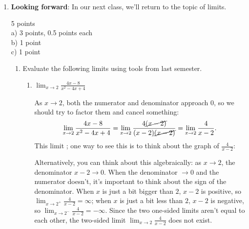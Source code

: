 \documentclass{article}
\begin{document}
\begin{enumerate}


\item %

\textbf{Looking forward}:  In our next class, we'll return to the topic of limits.
  \begin{grading}
  5 points\\
  a) 3 points, 0.5 points each\\
  b) 1 point\\
  c) 1 point
  \end{grading}

  \begin{enumerate}
  \item  \label{lhopital-prep-old-limits}
    Evaluate the following limits using tools from last semester. 
    \begin{enumerate}      

      \item \label{lhopital-prep-old-limits-0/0-1}
        \begin{problem}[\vfill]
          $\displaystyle \lim_{x\to 2} \frac{4x-8}{x^2-4x+4}$
        \end{problem}
        

        \begin{solution}
          As $x \to 2$, both the numerator and denominator approach 0, so
          we should try to factor them and cancel something:
          \[ \lim_{x \to 2} \frac{4x - 8}{x^2 - 4x + 4} = \lim_{x \to 2}
          \frac{ 4 \cancel{(x - 2)}}{(x - 2) \cancel{(x - 2)}} = \lim_{x
            \to 2} \frac{4}{x - 2}.\]
          This limit ; one way to see this is to
          think about the graph of $\frac{4}{x - 2}$:
          \begin{center}
          \end{center}
          Alternatively, you can think about this algebraically: as $x \to
          2$, the denominator $x - 2 \to 0$.  When the denominator $\to 0$
          and the numerator doesn't, it's important to think about the
          sign of the denominator.  When $x$ is just a bit bigger than
          $2$, $x - 2$ is positive, so $\displaystyle \lim_{x \to 2^+}
          \frac{4}{x - 2} = \infty$; when $x$ is just a bit less than $2$,
          $x - 2$ is negative, so $\displaystyle \lim_{x \to 2^-}
          \frac{4}{x - 2} = - \infty$.  Since the two one-sided limits
          aren't equal to each other, the two-sided limit $\displaystyle
          \lim_{x \to 2} \frac{4}{x - 2}$ does not exist. 
        \end{solution}


\end{enumerate}
\end{enumerate}
\end{enumerate}
\end{document}

